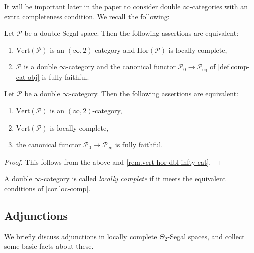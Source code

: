 \documentclass[a4paper, 11pt]{amsart}
\numberwithin{theorem}{section}
\theoremstyle{definition}
\renewcommand{\P}{\mathscr{P}}
\renewcommand{\Vert}{\mathrm{Vert}}
\newcommand{\Hor}{\mathrm{Hor}}
\begin{document}
It will be important later in the paper to consider double $\infty$-categories with an extra completeness condition.
We recall the following:


\begin{proposition}
	Let $\P$ be  a double Segal space. Then the following assertions are equivalent:
	\begin{enumerate}
		\item $\Vert(\P)$ is an $(\infty,2)$-category and $\Hor(\P)$ is locally complete,
		\item $\P$ is a double $\infty$-category and the canonical functor $\P_0 \to \P_\mathrm{eq}$ of \cref{def.comp-cat-obj} is fully faithful.
	\end{enumerate}
\end{proposition}

\begin{corollary}\label{cor.loc-comp}
	Let $\P$ be a double $\infty$-category. Then the following assertions are equivalent:
	\begin{enumerate}
		\item $\Vert(\P)$ is an $(\infty,2)$-category,
		\item $\Vert(\P)$ is locally complete,
		\item the canonical functor $\P_0 \to \P_\mathrm{eq}$ is fully faithful.
	\end{enumerate}
\end{corollary}
\begin{proof}
This follows from the above and \cref{rem.vert-hor-dbl-infty-cat}.
\end{proof}

\begin{definition}
	A double $\infty$-category is called \textit{locally complete}
	if it meets the equivalent conditions of \cref{cor.loc-comp}.
\end{definition}

\subsection{Adjunctions} We briefly discuss adjunctions in locally complete $\Theta_2$-Segal spaces, and collect some basic facts about these. 
\end{document}
